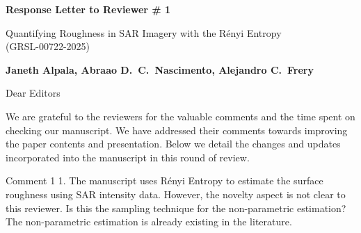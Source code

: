 \documentclass[11pt]{report}
\begin{document}
\begin{center}
\large{\textbf{Response Letter to Reviewer \# 1}}

\vglue 0.3cm

\huge{ Quantifying Roughness in SAR Imagery with the Rényi Entropy\\ (GRSL-00722-2025)}
\end{center}

\begin{center}
\textbf{Janeth Alpala,   Abraao D.\ C.\ Nascimento, Alejandro C.\ Frery  }
\end{center}

\date{\today}



\vspace{2cm}
\noindent Dear Editors
\bigskip

\noindent We are grateful to the reviewers for the valuable comments and the time spent on checking our manuscript. 
We have addressed their comments towards improving the paper contents and presentation. 
Below we detail the changes and updates incorporated into the manuscript in this round of review.

\medskip


\begin{reviewbox}{Comment 1}
1. The manuscript uses Rényi Entropy to estimate the surface roughness using SAR intensity data. However, the novelty aspect is not clear to this reviewer. Is this the sampling technique for the non-parametric estimation? The non-parametric estimation is already existing in the literature.

\end{reviewbox}
\end{document}
